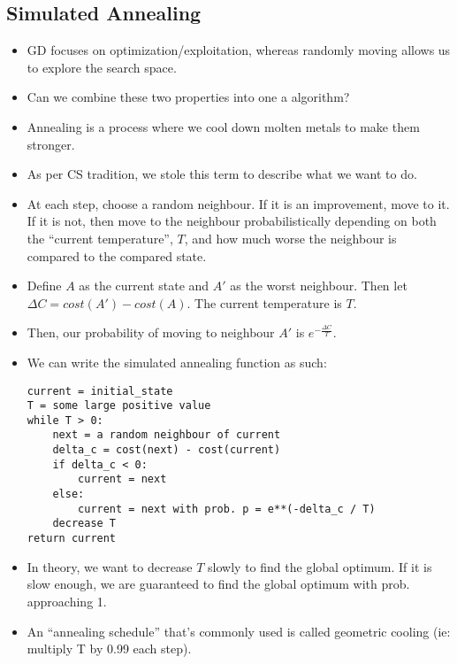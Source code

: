 \documentclass{article}
\begin{document}
\subsection{Simulated Annealing}
\begin{itemize}
    \item GD focuses on optimization/exploitation, whereas randomly moving allows us to explore the search space.
    \item Can we combine these two properties into one a algorithm?
    \item Annealing is a process where we cool down molten metals to make them stronger.
    \item As per CS tradition, we stole this term to describe what we want to do.
    \item At each step, choose a random neighbour.  If it is an improvement, move to it.  If it is not, then move to the neighbour probabilistically depending on both the ``current temperature'', $T$, and how much worse the neighbour is compared to the compared state.
    \item Define $A$ as the current state and $A'$ as the worst neighbour.  Then let $\Delta C = cost(A') - cost(A)$.  The current temperature is $T$.
    \item Then, our probability of moving to neighbour $A'$ is $e^{-\frac{\Delta C}{T}}$.
    \item We can write the simulated annealing function as such:
\begin{lstlisting}
current = initial_state
T = some large positive value
while T > 0:
    next = a random neighbour of current
    delta_c = cost(next) - cost(current)
    if delta_c < 0:
        current = next
    else:
        current = next with prob. p = e**(-delta_c / T)
    decrease T
return current
\end{lstlisting}
    \item In theory, we want to decrease $T$ slowly to find the global optimum.  If it is slow enough, we are guaranteed to find the global optimum with prob. approaching 1.
    \item An ``annealing schedule'' that's commonly used is called geometric cooling (ie: multiply T by 0.99 each step).
\end{itemize}
\end{document}

